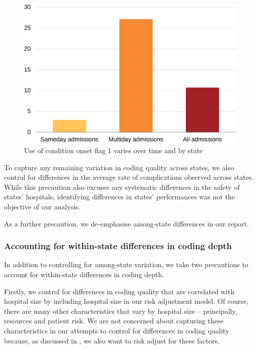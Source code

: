 \documentclass[submission]{grattan}
\begin{document}
\begin{figure}
\caption{Use of condition onset flag 1 varies over time and by state}\label{fig:use-of-condition-onset-flag-1-varies-over-time-and-by-state}
\includegraphics[page=24]{atlas/comps_charts.pdf}
\end{figure}

To capture any remaining variation in coding quality across states, we also control for differences in the average rate of complications observed across states.
While this precaution also excuses any systematic differences in the safety of states' hospitals, identifying differences in states' performances was not the objective of our analysis.

As a further precaution, we de-emphasise among-state differences in our report.

\subsubsection{Accounting for within-state differences in coding depth}\label{subsubsec:accounting-for-within-state-differences-in-coding-depth}

In addition to controlling for among-state variation, we take two precautions to account for within-state differences in coding depth.

Firstly, we control for differences in coding quality that are correlated with hospital size by including hospital size in our risk adjustment model.
Of course, there are many other characteristics that vary by hospital size -- principally, resources and patient risk.
We are not concerned about capturing these characteristics in our attempts to control for differences in coding quality because, as discussed in , we also want to risk adjust for these factors.
\end{document}
